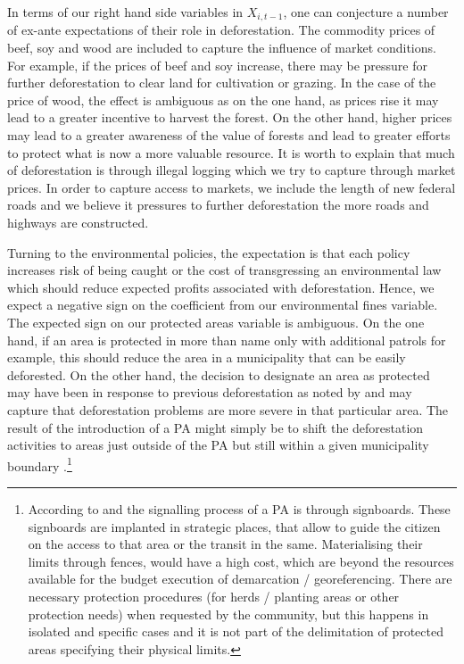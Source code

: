 In terms of our right hand side variables in $X_{i,t-1}$, one can conjecture a number of ex-ante expectations of their role in deforestation.  The commodity prices of beef, soy and wood are included to capture the influence of market conditions. For example, if the prices of beef and soy increase, there may be pressure for further deforestation to clear land for cultivation or grazing.  In the case of the price of wood, the effect is ambiguous as on the one hand, as prices rise it may lead to a greater incentive to harvest the forest.  On the other hand, higher prices may lead to a greater awareness of the value of forests and lead to greater efforts to protect what is now a more valuable resource. 
It is worth to explain that much of deforestation is through illegal logging which we try to capture through market prices. In order to capture access to markets, we include the length of new federal roads and we believe it pressures to further deforestation the more roads and highways are constructed.

Turning to the environmental policies, the expectation is that each policy increases risk of being caught or the cost of transgressing an environmental law which should reduce expected profits associated with deforestation. Hence, we expect a negative sign on the coefficient from our environmental fines variable. The expected sign on our protected areas variable is ambiguous.  On the one hand, if an area is protected in more than name only with additional patrols for example, this should reduce the area in a municipality that can be easily deforested.  On the other hand, the decision to designate an area as protected may have been in response to previous deforestation  as noted by \citet{hargrave_kis-katos_2012} and may capture that deforestation problems are more severe in that particular area. The result of the introduction of a PA might simply be to shift the deforestation activities to areas just outside of the PA but still within a given municipality boundary \citep{GIRARDI}.\footnote{According to \citet{ICMBIO} and \citet{FUNAI} the signalling process of a PA is through signboards. These signboards are implanted in strategic places, that allow to guide the citizen on the access to that area or the transit in the same. Materialising their limits through fences, would have a high cost, which are beyond the resources available for the budget execution of demarcation / georeferencing. There are necessary protection procedures (for herds / planting areas or other protection needs) when requested by the community, but this happens in isolated and specific cases and it is not part of the delimitation of protected areas specifying their physical limits.}

